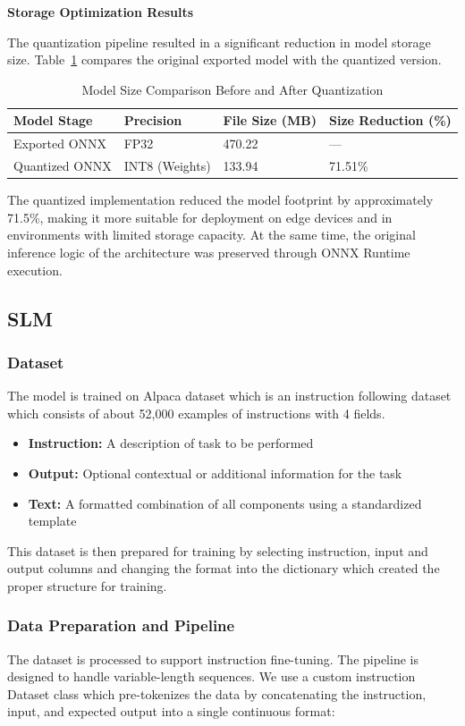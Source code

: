 \textbf{Storage Optimization Results}

The quantization pipeline resulted in a significant reduction in model storage size. Table~\ref{tab:quant_result} compares the original exported model with the quantized version.

\begin{table}[H]
\caption{Model Size Comparison Before and After Quantization}
\label{tab:quant_result}
\centering
\begin{tabular}{|l|l|l|l|}
\hline
\textbf{Model Stage} & \textbf{Precision} & \textbf{File Size (MB)} & \textbf{Size Reduction (\%)} \\
\hline
Exported ONNX & FP32 & 470.22 & --- \\
Quantized ONNX & INT8 (Weights) & 133.94 & 71.51\% \\
\hline
\end{tabular}
\end{table}

The quantized implementation reduced the model footprint by approximately 71.5\%, making it more suitable for deployment on edge devices and in environments with limited storage capacity. At the same time, the original inference logic of the architecture was preserved through ONNX Runtime execution.

\subsection{SLM}
\subsubsection{Dataset}
The model is trained on Alpaca dataset \cite{alpaca} which is an instruction following dataset which consists of about 52,000 examples of instructions with 4 fields.
\begin{itemize}
	\item \textbf{Instruction: }
	A description of task to be performed
	\item \textbf{Output: }
	Optional contextual or additional information for the task
	\item \textbf{Text: }
	A formatted combination of all components using a standardized template 
\end{itemize} 
This dataset is then prepared for training by selecting instruction, input and output columns and changing the format into the dictionary which created the proper structure for training. 

\subsubsection{Data Preparation and Pipeline}
The dataset is processed to support instruction fine-tuning. The pipeline is designed to handle variable-length sequences. We use a custom instruction Dataset class which pre-tokenizes the data by concatenating the instruction, input, and expected output into a single continuous format:

